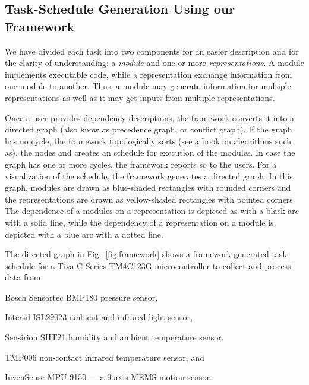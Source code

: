 \documentclass[]{IEEEtran}
\begin{document}
\subsection{Task-Schedule Generation Using our Framework}
\label{FrameWorkDescription}


We have divided each task into two components for an easier description and for the clarity of understanding: a {\em module} and one or more {\em representations}. A module implements executable code, while a representation exchange information from one module to another. Thus, a module may generate information for multiple representations as well as it may get inputs from multiple representations. 
\par
Once a user provides dependency descriptions, the framework converts it  into a directed graph (also know as precedence graph, or conflict graph).  If the graph has no cycle, the framework topologically sorts (see a book on algorithms such as\cite{Cormen:AlgorithmBook}), the nodes and creates an schedule for execution of the modules. In case the graph has one or more cycles, the framework reports so to the users.
For a visualization of the schedule, the framework  generates a directed graph. In this graph, modules are drawn as blue-shaded rectangles with rounded corners and the representations are drawn as yellow-shaded rectangles with pointed corners. The dependence of a modules on a representation is depicted as with a black arc with a solid line, while the dependency of a representation on a module is depicted with a blue arc with a dotted line. 

The directed graph in Fig.~\ref{fig:framework} shows a framework generated task-schedule 
for  a Tiva C Series TM4C123G microcontroller to collect and process data from 
\begin{inparaenum}[($i$)] \item Bosch Sensortec BMP180 pressure sensor, \item Intersil 
ISL29023 ambient and infrared light sensor, \item Sensirion SHT21 humidity and ambient 
temperature sensor,  \item  TMP006 non-contact infrared temperature sensor, and \item 
InvenSense 
MPU-9150 --- a 9-axis MEMS motion sensor. \end{inparaenum}
\end{document}
